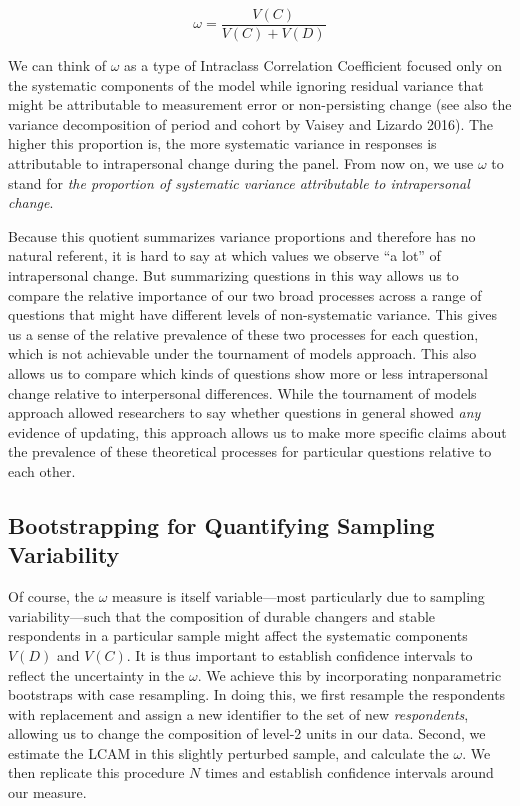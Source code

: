 \documentclass[
  11pt,
]{article}
\begin{document}
\[
\omega = \frac{V(C)}{V(C) + V(D)}
\]

We can think of \(\omega\) as a type of Intraclass Correlation
Coefficient focused only on the systematic components of the model while
ignoring residual variance that might be attributable to measurement
error or non-persisting change (see also the variance decomposition of
period and cohort by Vaisey and Lizardo 2016). The higher this
proportion is, the more systematic variance in responses is attributable
to intrapersonal change during the panel. From now on, we use \(\omega\)
to stand for \emph{the proportion of systematic variance attributable to
intrapersonal change}.

Because this quotient summarizes variance proportions and therefore has
no natural referent, it is hard to say at which values we observe ``a
lot'' of intrapersonal change. But summarizing questions in this way
allows us to compare the relative importance of our two broad processes
across a range of questions that might have different levels of
non-systematic variance. This gives us a sense of the relative
prevalence of these two processes for each question, which is not
achievable under the tournament of models approach. This also allows us
to compare which kinds of questions show more or less intrapersonal
change relative to interpersonal differences. While the tournament of
models approach allowed researchers to say whether questions in general
showed \emph{any} evidence of updating, this approach allows us to make
more specific claims about the prevalence of these theoretical processes
for particular questions relative to each other.

\subsection{Bootstrapping for Quantifying Sampling
Variability}\label{bootstrapping-for-quantifying-sampling-variability}

Of course, the \(\omega\) measure is itself variable---most particularly
due to sampling variability---such that the composition of durable
changers and stable respondents in a particular sample might affect the
systematic components \(V(D)\) and \(V(C)\). It is thus important to
establish confidence intervals to reflect the uncertainty in the
\(\omega\). We achieve this by incorporating nonparametric bootstraps
with case resampling. In doing this, we first resample the respondents
with replacement and assign a new identifier to the set of new
\emph{respondents}, allowing us to change the composition of level-2
units in our data. Second, we estimate the LCAM in this slightly
perturbed sample, and calculate the \(\omega\). We then replicate this
procedure \(N\) times and establish confidence intervals around our
measure.
\end{document}
